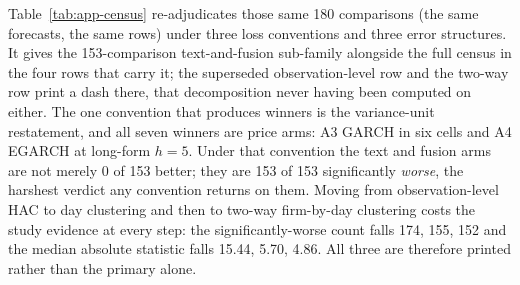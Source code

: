 Table~\ref{tab:app-census} re-adjudicates those same 180 comparisons
(the same forecasts, the same rows) under three loss conventions and
three error structures. It gives the 153-comparison text-and-fusion
sub-family alongside the full census in the four rows that carry it; the
superseded observation-level row and the two-way row print a dash there, that
decomposition never having been computed on either. The one convention
that produces winners is the variance-unit restatement, and all seven
winners are price arms: A3 GARCH in six cells and A4 EGARCH at long-form
$h{=}5$. Under that convention the text and fusion arms are not merely
0 of 153 better; they are 153 of 153 significantly \emph{worse}, the
harshest verdict any convention returns on them. Moving from
observation-level HAC to day clustering and then to two-way firm-by-day
clustering \cite{cameron2011twoway} costs the study evidence at every
step: the significantly-worse count falls 174, 155, 152 and the
median absolute statistic falls 15.44, 5.70, 4.86. All three are
therefore printed rather than the primary alone.

